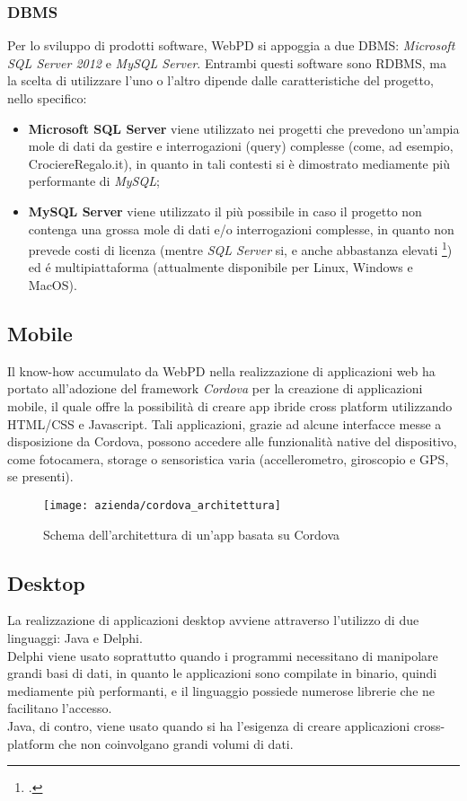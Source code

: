\subsubsection{DBMS}
Per lo sviluppo di prodotti software, WebPD si appoggia a due DBMS: \textit{Microsoft SQL Server 2012} e \textit{MySQL Server}. Entrambi questi software sono RDBMS, ma la scelta di utilizzare l'uno o l'altro dipende dalle caratteristiche del progetto, nello specifico: \begin{itemize}
	\item \textbf{Microsoft SQL Server} viene utilizzato nei progetti che prevedono un'ampia mole di dati da gestire e interrogazioni (query) complesse (come, ad esempio, CrociereRegalo.it), in quanto in tali contesti si è dimostrato mediamente più performante di \textit{MySQL};
	\item \textbf{MySQL Server} viene utilizzato il più possibile in caso il progetto non contenga una grossa mole di dati e/o interrogazioni complesse, in quanto non prevede costi di licenza (mentre \textit{SQL Server} si, e anche abbastanza elevati \footcite{site:sql-server-pricing}) ed é multipiattaforma (attualmente disponibile per Linux, Windows e MacOS).
\end{itemize}

\subsection{Mobile}
Il know-how accumulato da WebPD nella realizzazione di applicazioni web ha portato all'adozione del framework \textit{Cordova} per la creazione di applicazioni mobile, il quale offre la possibilità di creare app ibride cross platform utilizzando HTML/CSS e Javascript. Tali applicazioni, grazie ad alcune interfacce messe a disposizione da Cordova, possono accedere alle funzionalità native del dispositivo, come fotocamera, storage o sensoristica varia (accellerometro, giroscopio e GPS, se presenti).

\begin{figure}[!h] 
	\centering 
	\texttt{[image: azienda/cordova\_architettura]} 
	\caption{Schema dell'architettura di un'app basata su Cordova}
\end{figure}

\subsection{Desktop}
La realizzazione di applicazioni desktop avviene attraverso l'utilizzo di due linguaggi: Java e Delphi.\\
Delphi viene usato soprattutto quando i programmi necessitano di manipolare grandi basi di dati, in quanto le applicazioni sono compilate in binario, quindi mediamente più performanti, e il linguaggio possiede numerose librerie che ne facilitano l'accesso.\\
Java, di contro, viene usato quando si ha l'esigenza di creare applicazioni cross-platform che non coinvolgano grandi volumi di dati.

